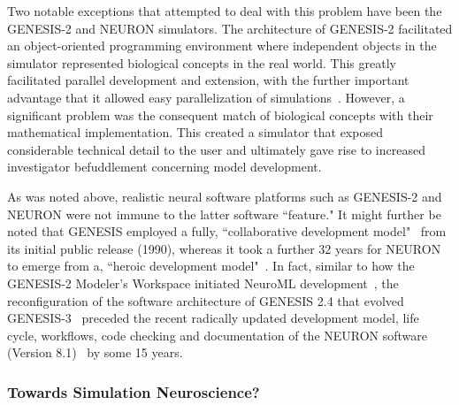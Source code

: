 \documentclass[10pt,letterpaper]{article}
\begin{document}
Two notable exceptions that attempted to deal with this problem have been the GENESIS-2 and NEURON simulators.  The architecture of GENESIS-2 facilitated an object-oriented programming environment where independent objects in the simulator represented biological concepts in the real world. This greatly facilitated parallel development and extension, with the further important advantage that it allowed easy parallelization of simulations~\cite{goddard97:_paral_genes}. However, a significant problem was the consequent match of biological concepts with their mathematical implementation. This created a simulator that exposed considerable technical detail to the user and ultimately gave rise to increased investigator befuddlement concerning model development.

As was noted above, realistic neural software platforms such as GENESIS-2 and NEURON were not immune to the latter software ``feature." It might further be noted that GENESIS employed a fully, ``collaborative development model"~\cite{gewaltig14} from its initial public release (1990), whereas it took a further 32 years for NEURON to emerge from a, ``heroic development model"~\cite{gewaltig14}. In fact,
similar to how the GENESIS-2 Modeler's Workspace initiated NeuroML development~\cite{nigel01:_towar_neurom},
the reconfiguration of the software architecture of GENESIS 2.4 that evolved GENESIS-3~\cite{cornelis08:_cbi_archit_comput_simul_realis,cornelis08:_model_neuros_genes} preceded the recent radically updated development model, life cycle, workflows, code checking and documentation of the NEURON software (Version 8.1)~\cite{awile22} by some 15 years.



\subsubsection*{Towards Simulation Neuroscience?}
\label{subsection:simneuro}
\end{document}
